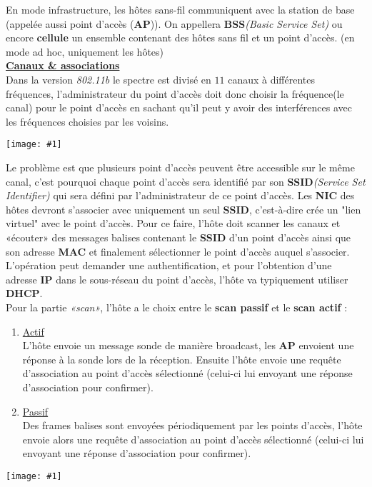 \documentclass{article}
\newcommand{\imgR}[2]{\begin{center}\texttt{[image: \#1]}\end{center}}
\newcommand{\stitre}[1]{\noindent\textbf{\underline{#1}} \\}
\begin{document}
\noindent En mode infrastructure, les hôtes sans-fil communiquent avec la station de base (appelée aussi point 
d'accès (\textbf{AP})). On appellera \textbf{BSS}\textit{(Basic Service Set)} ou encore \textbf{cellule} un 
ensemble contenant des hôtes sans fil et un point d'accès. (en mode ad hoc, uniquement les hôtes) \\

\stitre{Canaux \& associations}

Dans la version \textit{802.11b} le spectre est divisé en $11$ canaux à différentes fréquences, l'administrateur 
du point d'accès doit donc choisir la fréquence(le canal) pour le point d'accès en sachant qu'il peut y avoir des
interférences avec les fréquences choisies par les voisins.  

\imgR{CN_151.png}{300}

Le problème est que plusieurs point d'accès peuvent être accessible sur le même canal, c'est pourquoi chaque 
point d'accès sera identifié par son \textbf{SSID}\textit{(Service Set Identifier)} qui sera défini par 
l'administrateur de ce point d'accès. Les \textbf{NIC} des hôtes devront s'associer avec uniquement un seul 
\textbf{SSID}, c'est-à-dire crée un "lien virtuel" avec le point d'accès. Pour ce faire, l'hôte doit scanner les
canaux et «écouter» des messages balises contenant le \textbf{SSID} d'un point d'accès ainsi que son adresse 
\textbf{MAC} et finalement sélectionner le point d'accès auquel s'associer. L'opération peut demander une 
authentification, et pour l'obtention d'une adresse \textbf{IP} dans le sous-réseau du point d'accès, l'hôte va 
typiquement utiliser \textbf{DHCP}. \\
Pour la partie \textit{«scan»}, l'hôte a le choix entre le \textbf{scan passif} et le \textbf{scan actif} :
\begin{enumerate}
\item \underline{Actif} \\
L'hôte envoie un message sonde de manière broadcast, les \textbf{AP} envoient une réponse à la sonde lors de la 
réception. Ensuite l'hôte envoie une requête d'association au point d'accès sélectionné (celui-ci lui envoyant 
une réponse d'association pour confirmer).
\item \underline{Passif} \\
Des frames balises sont envoyées périodiquement par les points d'accès, l'hôte envoie alors une requête 
d'association au point d'accès sélectionné (celui-ci lui envoyant une réponse d'association pour confirmer).
\end{enumerate}
\imgR{CN_152.png}{350}
\end{document}
